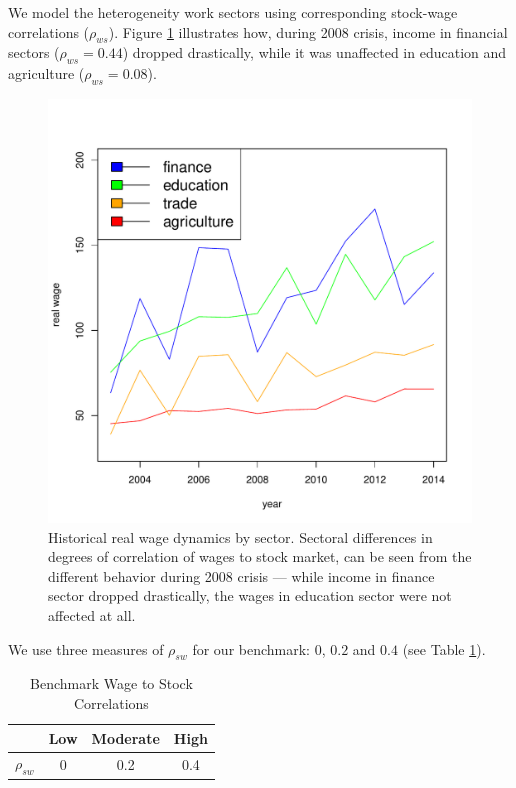 We model the heterogeneity work sectors using corresponding stock-wage correlations ($\rho_{ws}$). Figure \ref{fig:wagesec} illustrates how, during 2008 crisis, income in financial sectors ($\rho_{ws} = 0.44$) dropped drastically, while it was unaffected in education and agriculture ($\rho_{ws} = 0.08$).
\begin{figure}[h!]
	\centering
	\includegraphics[scale=0.4]{figs/wage2sec.pdf}
	\caption{Historical real wage dynamics by sector. Sectoral differences in degrees of correlation of wages to stock market, can be seen from the different behavior during 2008 crisis --- while income in finance sector dropped drastically, the wages in education sector were not affected at all.}
	\label{fig:wagesec}
\end{figure}

We use three measures of $\rho_{sw}$ for our benchmark: $0$, $0.2$ and $0.4$ (see Table \ref{table:wagesec}).


\begin{table}[h!]
	\centering
	\caption{Benchmark Wage to Stock Correlations}
	\label{table:wagesec}
	\begin{tabular}[c]{c|ccc}
		&Low&Moderate&High\\
		\hline
		$\rho_{sw}$&0&0.2&0.4
	\end{tabular}
\end{table}


